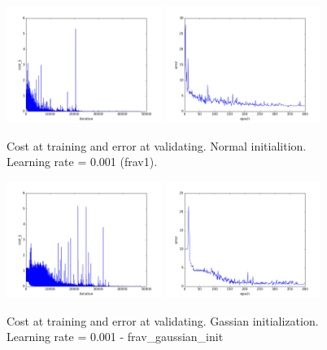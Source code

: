\begin{figure}[htb]
\centering
\includegraphics[width=0.45\textwidth]{images/FRAv_casia_ImageNet/Imagenet2/frav/frav1/cost_frav.png}
\includegraphics[width=0.45\textwidth]{images/FRAv_casia_ImageNet/Imagenet2/frav/frav1/error_frav.png}
\caption{Cost at training and error at validating. Normal initialition. Learning rate = 0.001 (frav1).} \label{fig:Imagenet2-frav1}
\end{figure}

\begin{figure}[htb]
\centering
\includegraphics[width=0.45\textwidth]{images/FRAv_casia_ImageNet/Imagenet2/frav/frav_gaussian_init/cost_frav.png}
\includegraphics[width=0.45\textwidth]{images/FRAv_casia_ImageNet/Imagenet2/frav/frav_gaussian_init/error_frav.png}
\caption{Cost at training and error at validating. Gassian initialization. Learning rate = 0.001 - frav\_gaussian\_init} \label{fig:Imagenet2-frav_gaussian_init}
\end{figure}

